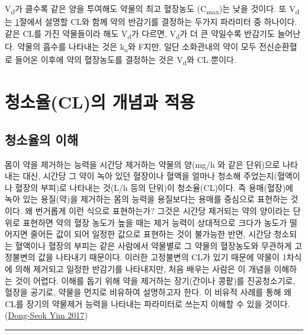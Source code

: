 \documentclass[
  11pt,
  krantz2, a4paper, twoside]{krantz}
\theoremstyle{definition}
\theoremstyle{definition}
\theoremstyle{definition}
\theoremstyle{definition}
\theoremstyle{remark}
\begin{document}
V\textsubscript{d}가 클수록 같은 양을 투여해도 약물의 최고 혈장농도 (C\textsubscript{max})는 낮을 것이다.
또 V\textsubscript{d}는 \ref{clearance-concept}절에서 설명할 CL와 함께 약의 반감기를 결정하는 두가지 파라미터 중 하나이다. 
같은 CL를 가진 약물들이라 해도 V\textsubscript{d}가 다르면, V\textsubscript{d}가 더 큰 약일수록 반감기도 늘어난다. 
약물의 흡수를 나타내는 것은 k\textsubscript{a}와 F지만, 일단 소화관내의 약이 모두 전신순환혈로 들어온 이후에 약의 혈장농도를 결정하는 것은 V\textsubscript{d}와 CL 뿐이다.

\hypertarget{clearance-concept}{%
\section{청소율(CL)의 개념과 적용}\label{clearance-concept}}

\hypertarget{uxccaduxc18cuxc728uxc758-uxc774uxd574}{%
\subsection{\texorpdfstring{청소율의 이해}{청소율의 이해}}\label{uxccaduxc18cuxc728uxc758-uxc774uxd574}}

몸이 약을 제거하는 능력을 시간당 제거하는 약물의 양(mg/h 와 같은 단위)으로 나타내는 대신, 시간당 그 약이 녹아 있던 혈장이나 혈액을 얼마나 청소해 주었는지(혈액이나 혈장의 부피)로 나타내는 것(L/h 등의 단위)이 청소율(CL)이다. 
즉 용매(혈장)에 녹아 있는 용질(약)을 제거하는 몸의 능력을 용질보다는 용매를 중심으로 표현하는 것이다.
왜 번거롭게 이런 식으로 표현하는가?
그것은 시간당 제거되는 약의 양이라는 단위로 표현하면 약의 혈장 농도가 높을 때는 제거 능력이 상대적으로 크다가 농도가 떨어지면 줄어든 값이 되어 일정한 값으로 표현하는 것이 불가능한 반면, 시간당 청소되는 혈액이나 혈장의 부피는 같은 사람에서 약물별로 그 약물의 혈장농도와 무관하게 고정불변의 값을 나타내기 때문이다.
이러한 고정불변의 CL가 있기 때문에 약물이 1차식에 의해 제거되고 일정한 반감기를 나타내지만, 처음 배우는 사람은 이 개념을 이해하는 것이 어렵다. 
이해를 돕기 위해 약을 제거하는 장기(간이나 콩팥)를 진공청소기로, 혈장을 공기로, 약물을 먼지로 비유하여 설명하고자 한다.
이 비유적 사례를 통해 왜 CL를 장기의 약물제거 능력을 나타내는 파라미터로 쓰는지 이해할 수 있을 것이다. (\protect\hyperlink{ref-yim2017tutorial}{Dong-Seok Yim 2017})

\begin{center}\rule{0.5\linewidth}{0.5pt}\end{center}
\end{document}
